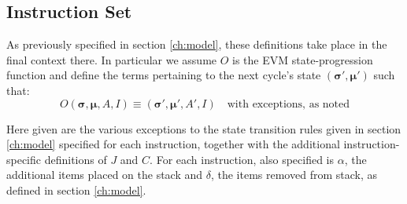 \documentclass[9pt,oneside]{amsart}
\begin{document}
\subsection{Instruction Set}
\label{subsec:instruction-set}

As previously specified in section \ref{ch:model}, these definitions take place in the final context there. In particular we assume $O$ is the EVM state-progression function and define the terms pertaining to the next cycle's state $(\boldsymbol{\sigma}', \boldsymbol{\mu}')$ such that:
\begin{equation}
O(\boldsymbol{\sigma}, \boldsymbol{\mu}, A, I) \equiv (\boldsymbol{\sigma}', \boldsymbol{\mu}', A', I) \quad \text{with exceptions, as noted}
\end{equation}

Here given are the various exceptions to the state transition rules given in section \ref{ch:model} specified for each instruction, together with the additional instruction-specific definitions of $J$ and $C$. For each instruction, also specified is $\alpha$, the additional items placed on the stack and $\delta$, the items removed from stack, as defined in section \ref{ch:model}.
\end{document}
